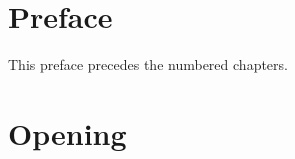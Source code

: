\documentclass[openany]{book}
\begin{document}
\frontmatter
\tableofcontents
\chapter{Preface}
This preface precedes the numbered chapters.
\mainmatter
\chapter{Opening}
\lipsum[1-22]
\end{document}
